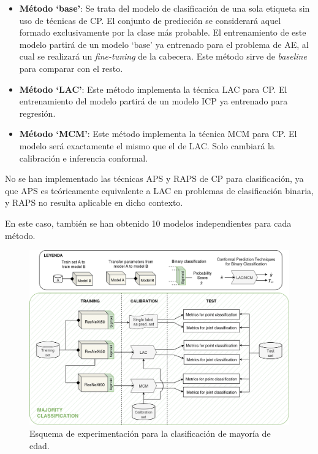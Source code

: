 \begin{itemize}

    \item \textbf{Método `base'}: Se trata del modelo de clasificación de una sola etiqueta sin uso de técnicas de CP. El conjunto de predicción se considerará aquel formado exclusivamente por la clase más probable. El entrenamiento de este modelo partirá de un modelo `base' ya entrenado para el problema de AE, al cual se realizará un \textit{fine-tuning} de la cabecera. Este método sirve de \textit{baseline} para comparar con el resto. 

    \item \textbf{Método `LAC'}: Este método implementa la técnica LAC para CP. El entrenamiento del modelo partirá de un modelo ICP ya entrenado para regresión.

    \item \textbf{Método `MCM'}: Este método implementa la técnica MCM para CP. El modelo será exactamente el mismo que el de LAC. Solo cambiará la calibración e inferencia conformal. 

\end{itemize} 

No se han implementado las técnicas APS y RAPS de CP para clasificación, ya que APS es teóricamente equivalente a LAC en problemas de clasificación binaria, y RAPS no resulta aplicable en dicho contexto.

En este caso, también se han obtenido 10 modelos independientes para cada método. 

\begin{figure}[h]
    \centering
    \includegraphics[angle=90, width=\textwidth]{capitulos/cap_05/imagenes/AMM_experimental_pipeline.png}
    \caption[
        Esquema de experimentación para la clasificación de mayoría de edad.
    ]{
        Esquema de experimentación para la clasificación de mayoría de edad. 
    } 
    \label{fig:AMM_experimental_pipeline}
\end{figure}

